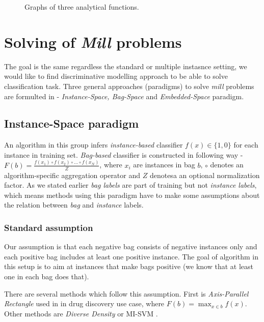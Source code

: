 \begin{figure}[!ht]
    \centering
    
    \caption{Graphs of three analytical functions.}
    \label{fig:analytical}
\end{figure}


\section{Solving of \emph{Mill} problems}
The goal is the same regardless the standard or multiple instasnce setting, we would like to find discriminative modelling approach to be able to solve classification task. Three general approaches (paradigms) to solve \emph{mill} problems are formulted in \cite{Amores2013} - \emph{Instance-Space, Bag-Space} and \emph{Embedded-Space} paradigm.

\subsection{Instance-Space paradigm}
An algorithm in this group infers \emph{instance-based} classifier $f(x) \in \{1,0\}$ for each instance in training set. \emph{Bag-based} classifier is constructed in following way - $F(b)=\frac{f(x_1)\circ f(x_2)\circ\dots\circ f(x_N)}{Z}$, where $x_i$ are instances in bag $b$, $\circ$ denotes an algorithm-specific aggregation operator and $Z$ denotesa an optional normalization factor. As we stated earlier \emph{bag labels} are part of training but not \emph{instance labels}, which means methods using this paradigm have to make some assumptions about the relation between \emph{bag} and \emph{instance} labels.
\subsubsection{Standard assumption}
Our assumption is that each negative bag consists of negative instances only and each positive bag includes at least one positive instance. The goal of algorithm in this setup is to aim at instances that make bags positive (we know that at least one in each bag does that).

There are several methods which follow this assumption. First is \emph{Axis-Parallel Rectangle} used in \cite{Dietterich1997} in drug discovery use case, where $F(b)=\max_{x\in b}f(x)$. Other methods are \emph{Diverse Density} \cite{Maron1998} or MI-SVM \cite{Andrews2003}.

